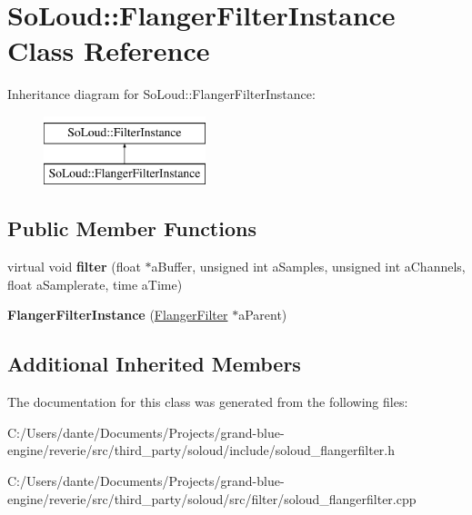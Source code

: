\hypertarget{class_so_loud_1_1_flanger_filter_instance}{}\section{So\+Loud\+::Flanger\+Filter\+Instance Class Reference}
\label{class_so_loud_1_1_flanger_filter_instance}
Inheritance diagram for So\+Loud\+::Flanger\+Filter\+Instance\+:\begin{figure}[H]
\begin{center}
\leavevmode
\includegraphics[height=2.000000cm]{class_so_loud_1_1_flanger_filter_instance}
\end{center}
\end{figure}
\subsection*{Public Member Functions}
\begin{DoxyCompactItemize}
\item 
\mbox{\label{class_so_loud_1_1_flanger_filter_instance_a16617ca2741a7902fbbb069a47ad9452}} 
virtual void {\bfseries filter} (float $\ast$a\+Buffer, unsigned int a\+Samples, unsigned int a\+Channels, float a\+Samplerate, time a\+Time)
\item 
\mbox{\label{class_so_loud_1_1_flanger_filter_instance_acb2cc164d3bbfc69d43ebaeb296502f3}} 
{\bfseries Flanger\+Filter\+Instance} (\mbox{\hyperlink{class_so_loud_1_1_flanger_filter}{Flanger\+Filter}} $\ast$a\+Parent)
\end{DoxyCompactItemize}
\subsection*{Additional Inherited Members}


The documentation for this class was generated from the following files\+:\begin{DoxyCompactItemize}
\item 
C\+:/\+Users/dante/\+Documents/\+Projects/grand-\/blue-\/engine/reverie/src/third\+\_\+party/soloud/include/soloud\+\_\+flangerfilter.\+h\item 
C\+:/\+Users/dante/\+Documents/\+Projects/grand-\/blue-\/engine/reverie/src/third\+\_\+party/soloud/src/filter/soloud\+\_\+flangerfilter.\+cpp\end{DoxyCompactItemize}
